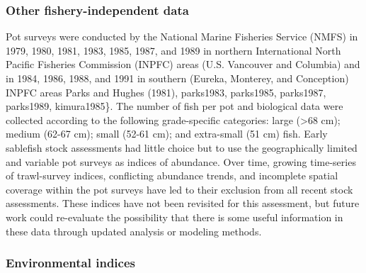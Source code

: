 \documentclass[11pt,
  english,
  a4paper,
]{article}
\begin{document}
\leavevmode\tagmcend\tagstructend\par


\hypertarget{other-fishery-independent-data}{%
\subsubsection{Other fishery-independent data}\label{other-fishery-independent-data}}

\leavevmode\tagmcend\tagstructend


Pot surveys were conducted by the National Marine Fisheries Service (NMFS) in 1979, 1980, 1981, 1983, 1985, 1987, and 1989 in northern International North Pacific Fisheries Commission (INPFC) areas (U.S. Vancouver and Columbia) and in 1984, 1986, 1988, and 1991 in southern (Eureka, Monterey, and Conception) INPFC areas {Parks and Hughes (1981)\leavevmode\tagmcend\tagstructend}, parks1983, parks1985, parks1987, parks1989, kimura1985\}. The number of fish per pot and biological data were collected according to the following grade-specific categories: large (\textgreater68 cm); medium (62-67 cm); small (52-61 cm); and extra-small (51 cm) fish. Early sablefish stock assessments had little choice but to use the geographically limited and variable pot surveys as indices of abundance. Over time, growing time-series of trawl-survey indices, conflicting abundance trends, and incomplete spatial coverage within the pot surveys have led to their exclusion from all recent stock assessments. These indices have not been revisited for this assessment, but future work could re-evaluate the possibility that there is some useful information in these data through updated analysis or modeling methods.

\leavevmode\tagmcend\tagstructend\par


\hypertarget{environmental-indices}{%
\subsubsection{Environmental indices}\label{environmental-indices}}

\leavevmode\tagmcend\tagstructend

\end{document}
